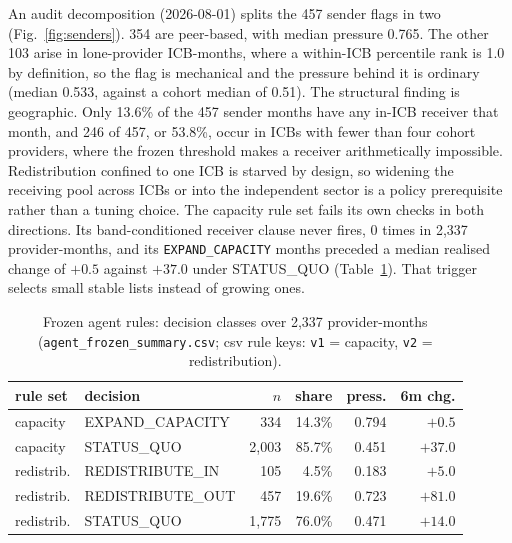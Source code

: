 \documentclass[conference]{IEEEtran}
\begin{document}
An audit decomposition (2026-08-01) splits the 457 sender flags in two (Fig.~\ref{fig:senders}).
354 are peer-based, with median pressure 0.765. The other 103 arise in lone-provider ICB-months,
where a within-ICB percentile rank is 1.0 by definition, so the flag is mechanical and the pressure
behind it is ordinary (median 0.533, against a cohort median of 0.51). The structural finding is
geographic. Only 13.6\% of the 457 sender months have any in-ICB receiver that month, and 246 of
457, or 53.8\%, occur in ICBs with fewer than four cohort providers, where the frozen threshold
makes a receiver arithmetically impossible. Redistribution confined to one ICB is starved by
design, so widening the receiving pool across ICBs or into the independent sector is a policy
prerequisite rather than a tuning choice. The capacity rule set fails its own checks in both
directions. Its band-conditioned receiver clause never fires, 0 times in 2{,}337 provider-months,
and its \texttt{EXPAND\_CAPACITY} months preceded a median realised change of $+0.5$ against
$+37.0$ under STATUS\_QUO (Table~\ref{tab:agent}). That trigger selects small stable lists instead
of growing ones.

\begin{table}[t]
\caption{Frozen agent rules: decision classes over 2{,}337 provider-months
(\texttt{agent\_frozen\_summary.csv}; csv rule keys: \texttt{v1} = capacity,
\texttt{v2} = redistribution).}
\label{tab:agent}
\centering
\scriptsize
\setlength{\tabcolsep}{4pt}
\begin{tabular}{llrrrr}
\toprule
rule set & decision & $n$ & share & press. & 6m chg. \\
\midrule
capacity & EXPAND\_CAPACITY & 334 & 14.3\% & 0.794 & $+0.5$ \\
capacity & STATUS\_QUO & 2{,}003 & 85.7\% & 0.451 & $+37.0$ \\
redistrib. & REDISTRIBUTE\_IN & 105 & 4.5\% & 0.183 & $+5.0$ \\
redistrib. & REDISTRIBUTE\_OUT & 457 & 19.6\% & 0.723 & $+81.0$ \\
redistrib. & STATUS\_QUO & 1{,}775 & 76.0\% & 0.471 & $+14.0$ \\
\bottomrule
\end{tabular}
\end{table}
\end{document}
